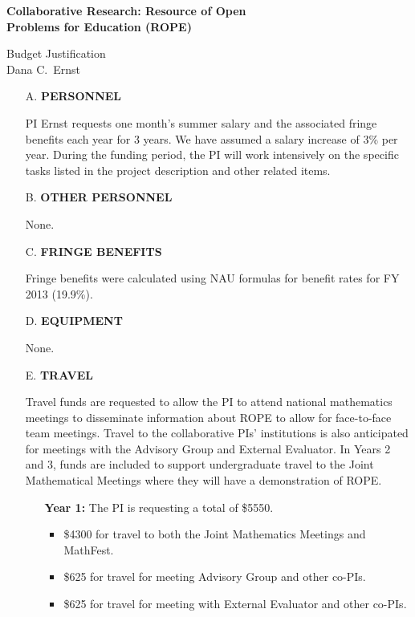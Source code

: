 \documentclass[11pt]{article}
\begin{document}
\begin{center}
{\Large \textbf{Collaborative Research: Resource of Open\\
Problems for Education (ROPE)}}

\bigskip

{\Large Budget Justification}\\
\smallskip
Dana C.~Ernst
\end{center}

\begin{enumerate}[leftmargin=*]

\item[A.] \textbf{PERSONNEL}

PI Ernst requests one month's summer salary and the associated fringe benefits each year for 3 years. We have assumed a salary increase of 3\% per year.  During the funding period, the PI will work intensively on the specific tasks listed in the project description and other related items. \hfill {}

\item[B.] \textbf{OTHER PERSONNEL}

None. \hfill {}

\item[C.] \textbf{FRINGE BENEFITS}

Fringe benefits were calculated using NAU formulas for benefit rates for FY 2013 (19.9\%).

\hfill {}

\item[D.] \textbf{EQUIPMENT}

None. \hfill {}

\item[E.] \textbf{TRAVEL}

Travel funds are requested to allow the PI to attend national mathematics meetings to disseminate information about ROPE to allow for face-to-face team meetings.  Travel to the collaborative PIs' institutions is also anticipated for meetings with the Advisory Group and External Evaluator. In Years 2 and 3, funds are included to support undergraduate travel to the Joint Mathematical Meetings where they will have a demonstration of ROPE.

\begin{enumerate}
\item[] \textbf{Year 1:} The PI is requesting a total of \$5550.
\begin{itemize}
\item \$4300 for travel to both the Joint Mathematics Meetings and MathFest.
\item \$625 for travel for meeting Advisory Group and other co-PIs.
\item \$625 for travel for meeting with External Evaluator and other co-PIs.
\end{itemize}


\end{enumerate}
\end{enumerate}
\end{document}
